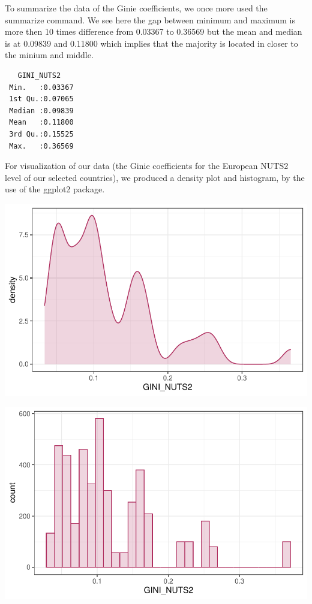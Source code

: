 \documentclass[
  a4paper,
  DIV=11,
  numbers=noendperiod]{scrartcl}
\begin{document}
To summarize the data of the Ginie coefficients, we once more used the
summarize command. We see here the gap between minimum and maximum is
more then 10 times difference from 0.03367 to 0.36569 but the mean and
median is at 0.09839 and 0.11800 which implies that the majority is
located in closer to the minium and middle.

\begin{verbatim}
   GINI_NUTS2     
 Min.   :0.03367  
 1st Qu.:0.07065  
 Median :0.09839  
 Mean   :0.11800  
 3rd Qu.:0.15525  
 Max.   :0.36569  
\end{verbatim}

For visualization of our data (the Ginie coefficients for the European
NUTS2 level of our selected countries), we produced a density plot and
histogram, by the use of the ggplot2 package.

\includegraphics{Eurostat-EDA_files/figure-pdf/unnamed-chunk-8-1.pdf}

\includegraphics{Eurostat-EDA_files/figure-pdf/unnamed-chunk-9-1.pdf}
\end{document}

